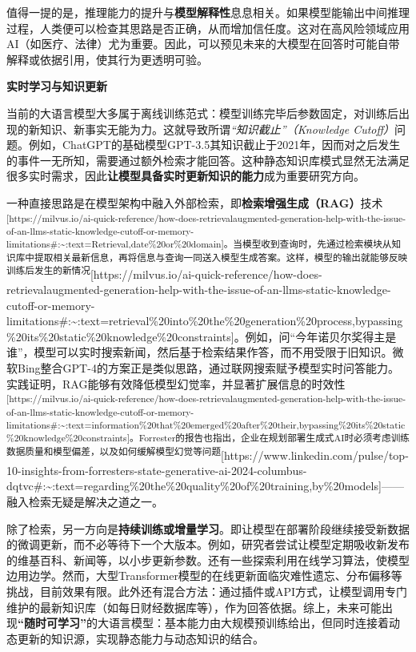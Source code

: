 \documentclass[
  letterpaper,
]{scrbook}
\begin{document}
值得一提的是，推理能力的提升与\textbf{模型解释性}息息相关。如果模型能输出中间推理过程，人类便可以检查其思路是否正确，从而增加信任度。这对在高风险领域应用AI（如医疗、法律）尤为重要。因此，可以预见未来的大模型在回答时可能自带解释或依据引用，使其行为更透明可验。

\textbf{实时学习与知识更新}

当前的大语言模型大多属于离线训练范式：模型训练完毕后参数固定，对训练后出现的新知识、新事实无能为力。这就导致所谓\emph{``知识截止''（Knowledge
Cutoff）}问题。例如，ChatGPT的基础模型GPT-3.5其知识截止于2021年，因而对之后发生的事件一无所知，需要通过额外检索才能回答。这种静态知识库模式显然无法满足很多实时需求，因此\textbf{让模型具备实时更新知识的能力}成为重要研究方向。

一种直接思路是在模型架构中融入外部检索，即\textbf{检索增强生成（RAG）}技术\textsuperscript{{[}https://milvus.io/ai-quick-reference/how-does-retrievalaugmented-generation-help-with-the-issue-of-an-llms-static-knowledge-cutoff-or-memory-limitations\#:\textasciitilde:text=Retrieval,date\%20or\%20domain{]}。当模型收到查询时，先通过检索模块从知识库中提取相关最新信息，再将信息与查询一同送入模型生成答案。这样，模型的输出就能够反映训练后发生的新情况}{[}https://milvus.io/ai-quick-reference/how-does-retrievalaugmented-generation-help-with-the-issue-of-an-llms-static-knowledge-cutoff-or-memory-limitations\#:\textasciitilde:text=retrieval\%20into\%20the\%20generation\%20process,bypassing\%20its\%20static\%20knowledge\%20constraints{]}。例如，问``今年诺贝尔奖得主是谁''，模型可以实时搜索新闻，然后基于检索结果作答，而不用受限于旧知识。微软Bing整合GPT-4的方案正是类似思路，通过联网搜索赋予模型实时问答能力。实践证明，RAG能够有效降低模型幻觉率，并显著扩展信息的时效性\textsuperscript{{[}https://milvus.io/ai-quick-reference/how-does-retrievalaugmented-generation-help-with-the-issue-of-an-llms-static-knowledge-cutoff-or-memory-limitations\#:\textasciitilde:text=information\%20that\%20emerged\%20after\%20their,bypassing\%20its\%20static\%20knowledge\%20constraints{]}。Forrester的报告也指出，企业在规划部署生成式AI时必须考虑训练数据质量和模型偏差，以及如何缓解模型幻觉等问题}{[}https://www.linkedin.com/pulse/top-10-insights-from-forresters-state-generative-ai-2024-columbus-dqtvc\#:\textasciitilde:text=regarding\%20the\%20quality\%20of\%20training,by\%20models{]}------融入检索无疑是解决之道之一。

除了检索，另一方向是\textbf{持续训练或增量学习}。即让模型在部署阶段继续接受新数据的微调更新，而不必等待下一个大版本。例如，研究者尝试让模型定期吸收新发布的维基百科、新闻等，以小步更新参数。还有一些探索利用在线学习算法，使模型边用边学。然而，大型Transformer模型的在线更新面临灾难性遗忘、分布偏移等挑战，目前效果有限。此外还有混合方法：通过插件或API方式，让模型调用专门维护的最新知识库（如每日财经数据库等），作为回答依据。综上，未来可能出现\textbf{``随时可学习''}的大语言模型：基本能力由大规模预训练给出，但同时连接着动态更新的知识源，实现静态能力与动态知识的结合。
\end{document}
